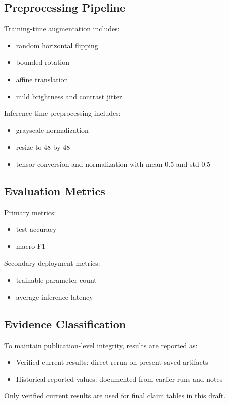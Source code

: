 \documentclass[12pt,a4paper]{article}
\begin{document}
\subsection{Preprocessing Pipeline}
Training-time augmentation includes:
\begin{itemize}[leftmargin=*]
    \item random horizontal flipping
    \item bounded rotation
    \item affine translation
    \item mild brightness and contrast jitter
\end{itemize}
Inference-time preprocessing includes:
\begin{itemize}[leftmargin=*]
    \item grayscale normalization
    \item resize to 48 by 48
    \item tensor conversion and normalization with mean 0.5 and std 0.5
\end{itemize}

\subsection{Evaluation Metrics}
Primary metrics:
\begin{itemize}[leftmargin=*]
    \item test accuracy
    \item macro F1
\end{itemize}
Secondary deployment metrics:
\begin{itemize}[leftmargin=*]
    \item trainable parameter count
    \item average inference latency
\end{itemize}

\subsection{Evidence Classification}
To maintain publication-level integrity, results are reported as:
\begin{itemize}[leftmargin=*]
    \item Verified current results: direct rerun on present saved artifacts
    \item Historical reported values: documented from earlier runs and notes
\end{itemize}
Only verified current results are used for final claim tables in this draft.
\end{document}
